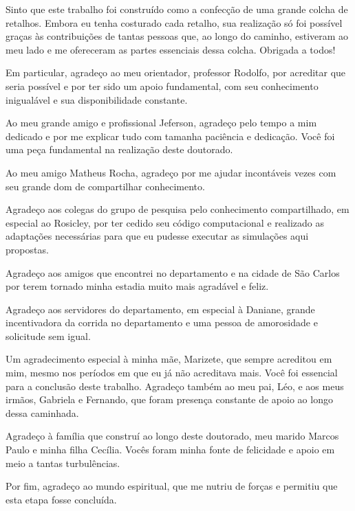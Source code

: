 \begin{agradecimentos}
	
Sinto que este trabalho foi construído como a confecção de uma grande colcha de retalhos. Embora eu tenha costurado cada retalho, sua realização só foi possível graças às contribuições de tantas pessoas que, ao longo do caminho, estiveram ao meu lado e me ofereceram as partes essenciais dessa colcha. Obrigada a todos!

Em particular, agradeço ao meu orientador, professor Rodolfo, por acreditar que seria possível e por ter sido um apoio fundamental, com seu conhecimento inigualável e sua disponibilidade constante.

Ao meu grande amigo e profissional Jeferson, agradeço pelo tempo a mim dedicado e por me explicar tudo com tamanha paciência e dedicação. Você foi uma peça fundamental na realização deste doutorado.

Ao meu amigo Matheus Rocha, agradeço por me ajudar incontáveis vezes com seu grande dom de compartilhar conhecimento.

Agradeço aos colegas do grupo de pesquisa pelo conhecimento compartilhado, em especial ao Rosicley, por ter cedido seu código computacional e realizado as adaptações necessárias para que eu pudesse executar as simulações aqui propostas.

Agradeço aos amigos que encontrei no departamento e na cidade de São Carlos por terem tornado minha estadia muito mais agradável e feliz.

Agradeço aos servidores do departamento, em especial à Daniane, grande incentivadora da corrida no departamento e uma pessoa de amorosidade e solicitude sem igual.

Um agradecimento especial à minha mãe, Marizete, que sempre acreditou em mim, mesmo nos períodos em que eu já não acreditava mais. Você foi essencial para a conclusão deste trabalho. Agradeço também ao meu pai, Léo, e aos meus irmãos, Gabriela e Fernando, que foram presença constante de apoio ao longo dessa caminhada.

Agradeço à família que construí ao longo deste doutorado, meu marido Marcos Paulo e minha filha Cecília. Vocês foram minha fonte de felicidade e apoio em meio a tantas turbulências.

Por fim, agradeço ao mundo espiritual, que me nutriu de forças e permitiu que esta etapa fosse concluída.
	
\end{agradecimentos}
